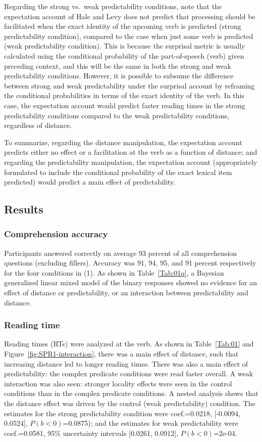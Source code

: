 \documentclass{frontiersSCNS}\usepackage{knitr} %
\begin{document}
Regarding the strong vs.\ weak predictability conditions, 
note that the expectation account of Hale and Levy does not predict that processing should be facilitated when the exact identity of the upcoming verb is predicted (strong predictability condition), compared to the case when just some verb is predicted (weak predictability condition). This is because the surprisal metric is usually calculated using the conditional probability of the part-of-speech (verb) given preceding context, and this will be the same in both the strong and weak predictability conditions. However, it is possible to subsume the difference between strong and weak predictability under the surprisal account by reframing the conditional probabilities in terms of the exact identity of the verb. In this case, the expectation account would predict faster reading times in the strong predictability conditions compared to the weak predictability conditions, regardless of distance. 

To summarize, regarding the distance manipulation, the expectation account predicts either no effect or a facilitation at the verb as a function of distance; and regarding the predictability manipulation, the expectation account (appropriately formulated to include the conditional probability of the exact lexical item predicted) would predict a main effect of predictability. 

\subsection{Results}

\subsubsection{Comprehension accuracy}
Participants answered correctly on average 
93 percent of all comprehension questions (excluding fillers). Accuracy was 
91, 94, 95, and 91
percent respectively for the four conditions in (1). As shown in Table~\ref{Tab:01q}, 
a Bayesian generalized linear mixed model of the binary responses showed no evidence for an effect of distance or predictability, or an interaction 
between predictability and distance. 

\subsubsection{Reading time}

Reading times (RTs) were analyzed at the verb.  As shown in Table~\ref{Tab:01} and Figure~\ref{fig:SPR1-interaction}, there was a main effect of distance, such that increasing distance led to longer reading times. There was also a main effect of predictability: the complex predicate conditions were read faster overall. A weak interaction was also seen: stronger locality effects were seen in the control conditions than in the complex predicate conditions. 
A nested analysis shows that the distance effect was driven by the control (weak predictability) condition.
The estimates for the strong predictability condition were 
coef.=0.0218, [-0.0094, 0.0524], $P(b<0)$=0.0875);
and the estimates for 
weak predictability were 
coef.=0.0581, 95\% uncertainty intervals [0.0261, 0.0912], $P(b<0)$=2e-04.
\end{document}
